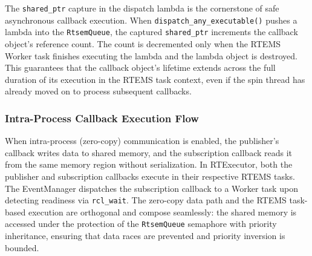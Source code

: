 The \texttt{shared\_ptr} capture in the dispatch lambda is the cornerstone of safe asynchronous callback execution.  When \texttt{dispatch\_any\_executable()} pushes a lambda into the \texttt{RtsemQueue}, the captured \texttt{shared\_ptr} increments the callback object's reference count.  The count is decremented only when the RTEMS Worker task finishes executing the lambda and the lambda object is destroyed.  This guarantees that the callback object's lifetime extends across the full duration of its execution in the RTEMS task context, even if the spin thread has already moved on to process subsequent callbacks.

\subsubsection{Intra-Process Callback Execution Flow}

When intra-process (zero-copy) communication is enabled, the publisher's callback writes data to shared memory, and the subscription callback reads it from the same memory region without serialization.  In RTExecutor, both the publisher and subscription callbacks execute in their respective RTEMS tasks.  The EventManager dispatches the subscription callback to a Worker task upon detecting readiness via \texttt{rcl\_wait}.  The zero-copy data path and the RTEMS task-based execution are orthogonal and compose seamlessly: the shared memory is accessed under the protection of the \texttt{RtsemQueue} semaphore with priority inheritance, ensuring that data races are prevented and priority inversion is bounded.
